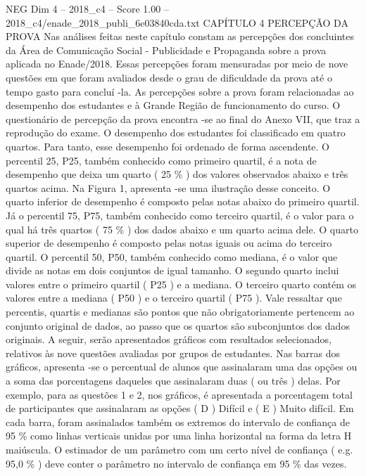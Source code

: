 \begin{textsample}{NEG Dim 4 – 2018\_c4 – Score 1.00 – 2018\_c4/enade\_2018\_publi\_6e03840cda.txt}  \label{ex:f4_neg_173}
CAPÍTULO 4 PERCEPÇÃO DA PROVA Nas análises feitas neste capítulo constam as percepções dos concluintes da Área de Comunicação Social - Publicidade e Propaganda sobre a prova aplicada no Enade/2018.
Essas percepções foram mensuradas por meio de nove questões em que foram avaliados desde o grau de dificuldade da prova até o tempo gasto para concluí -la.
As percepções sobre a prova foram relacionadas ao desempenho dos estudantes e à Grande Região de funcionamento do curso.
O questionário de percepção da prova encontra -se ao final do Anexo VII, que traz a reprodução do exame.
O desempenho dos estudantes foi classificado em quatro quartos.
Para tanto, esse desempenho foi ordenado de forma ascendente.
O percentil 25, P25, também conhecido como primeiro quartil, é a nota de desempenho que deixa um quarto ( 25 \% ) dos valores observados abaixo e três quartos acima.
Na Figura 1, apresenta -se uma ilustração desse conceito.
O quarto inferior de desempenho é composto pelas notas abaixo do primeiro quartil.
Já o percentil 75, P75, também conhecido como terceiro quartil, é o valor para o qual há três quartos ( 75 \% ) dos dados abaixo e um quarto acima dele.
O quarto superior de desempenho é composto pelas notas iguais ou acima do terceiro quartil.
O percentil 50, P50, também conhecido como mediana, é o valor que divide as notas em dois conjuntos de igual tamanho.
O segundo quarto inclui valores entre o primeiro quartil ( P25 ) e a mediana.
O terceiro quarto contém os valores entre a mediana ( P50 ) e o terceiro quartil ( P75 ).
Vale ressaltar que percentis, quartis e medianas são pontos que não obrigatoriamente pertencem ao conjunto original de dados, ao passo que os quartos são subconjuntos dos dados originais.
A seguir, serão apresentados gráficos com resultados selecionados, relativos às nove questões avaliadas por grupos de estudantes.
Nas barras dos gráficos, apresenta -se o percentual de alunos que assinalaram uma das opções ou a soma das porcentagens daqueles que assinalaram duas ( ou três ) delas.
Por exemplo, para as questões 1 e 2, nos gráficos, é apresentada a porcentagem total de participantes que assinalaram as opções ( D ) Difícil e ( E ) Muito difícil.
Em cada barra, foram assinalados também os extremos do intervalo de confiança de 95 \% como linhas verticais unidas por uma linha horizontal na forma da letra H maiúscula.
O estimador de um parâmetro com um certo nível de confiança ( e.g. 95,0 \% ) deve conter o parâmetro no intervalo de confiança em 95 \% das vezes.

\end{textsample}
